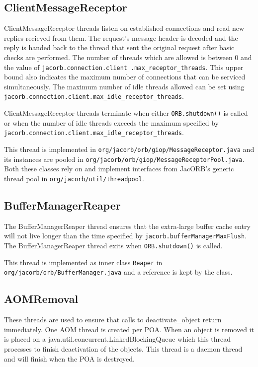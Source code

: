 \subsection*{ClientMessageReceptor}
ClientMessageReceptor threads listen on established connections and read new
replies recieved from them. The request's message header is decoded and the
reply is handed back to the thread that sent the original request after basic
checks are performed. The number of threads which are allowed is between 0 and
the value of {\tt jacorb.connection.client .max\_receptor\_threads}. This upper
bound also indicates the maximum number of connections that can be serviced
simultaneously. The maximum number of idle threads allowed can be set using
{\tt jacorb.connection.client.max\_idle\_receptor\_threads}.

ClientMessageReceptor threads terminate when either {\tt ORB.shutdown()}
is called or when the number of idle threads exceeds the maximum specified by
{\tt jacorb.connection.client.max\_idle\_receptor\_threads}.

This thread is implemented in {\tt org/jacorb/orb/giop/MessageReceptor.java}
and its instances are pooled in
{\tt org/jacorb/orb/giop/MessageReceptorPool.java}. Both these classes rely on
and implement interfaces from JacORB's generic thread pool in
{\tt org/jacorb/util/threadpool}.

\subsection*{BufferManagerReaper}
The BufferManagerReaper thread ensures that the extra-large buffer cache entry
will not live longer than the time specified by
{\tt jacorb.bufferManagerMaxFlush}. The BufferManagerReaper thread exits when
{\tt ORB.shutdown()} is called.

This thread is implemented as inner class {\tt Reaper} in {\tt
org/jacorb/orb/BufferManager.java} and a reference is kept by the class.

\subsection*{AOMRemoval}
These threads are used to ensure that calls to deactivate\_object return
immediately. One AOM thread is created per POA. When an object is removed it is placed
on a java.util.concurrent.LinkedBlockingQueue which this thread processes to finish
deactivation of the objects. This thread is a daemon thread and will finish when the POA
is destroyed.

